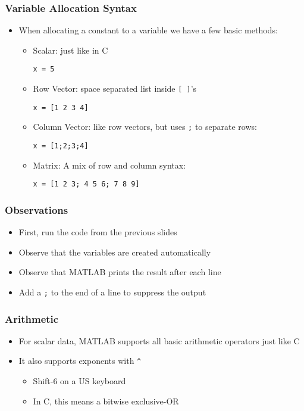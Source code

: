 \documentclass[14pt]{beamer}
\begin{document}
\begin{frame}[fragile]
\frametitle{Variable Allocation Syntax}
\begin{itemize}
\item When allocating a constant to a variable we have a few basic methods:
	\begin{itemize}
		\item Scalar: just like in C
			\begin{lstlisting}[style=pseudo]
x = 5
\end{lstlisting}
		\item Row Vector: space separated list inside \texttt{[ ]}'s
\begin{lstlisting}[style=pseudo]
x = [1 2 3 4]		
\end{lstlisting}
		\item Column Vector: like row vectors, but uses \texttt{;} to separate rows:
\begin{lstlisting}[style=pseudo]
x = [1;2;3;4]
\end{lstlisting}
		\item Matrix: A mix of row and column syntax:
\begin{lstlisting}[style=pseudo]
x = [1 2 3; 4 5 6; 7 8 9]
\end{lstlisting}
	\end{itemize}
\end{itemize}
\end{frame}

\begin{frame}
\frametitle{Observations}
\begin{itemize}
\item First, run the code from the previous slides
\pause
\item Observe that the variables are created automatically
\pause
\item Observe that MATLAB prints the result after each line
\item Add a \texttt{;} to the end of a line to suppress the output
\pause
\end{itemize}
\end{frame}

\begin{frame}
\frametitle{Arithmetic}
\begin{itemize}
\item For scalar data, MATLAB supports all basic arithmetic operators just like C
\item It also supports exponents with \texttt{\^}
	\begin{itemize}
		\item Shift-6 on a US keyboard
		\item In C, this means a bitwise exclusive-OR
	\end{itemize}
\end{itemize}
\end{frame}
\end{document}
